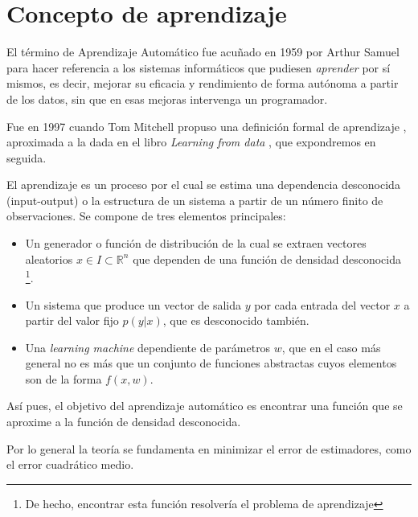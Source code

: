 %

\section{Concepto de aprendizaje}\label{sec:Aprendizaje}

El término de Aprendizaje Automático 
\cite{hisour} 
fue acuñado en 1959 por Arthur Samuel 
para hacer referencia a los sistemas informáticos que 
pudiesen \textit{aprender} por sí mismos, es decir, mejorar su 
eficacia y rendimiento de forma autónoma a partir de los datos, 
sin que en esas mejoras intervenga un programador.

Fue en 1997 cuando Tom Mitchell propuso una definición 
formal de aprendizaje 
\cite{tom-michell-machine-learning}, 
aproximada a la dada en el libro \textit{Learning from data}
\cite{learning-from-data-1-2}, que expondremos en seguida.

El aprendizaje es un proceso por el cual se estima una dependencia desconocida 
(input-output) o la estructura de un sistema a partir de un número finito de 
observaciones. Se compone de tres elementos principales: 

\begin{itemize}
    \item Un generador o función de distribución de la cual se extraen 
    vectores aleatorios 
    $x \in I \subset \mathbb R^ n$ 
    que dependen de una función de densidad desconocida \footnote{De hecho, encontrar esta función resolvería el problema de aprendizaje}.
    
    \item Un sistema que produce un vector de salida $y$ por cada entrada del vector $x$ a partir del valor fijo $p(y|x)$, que es desconocido también. 
    
    \item Una \textit{learning machine} dependiente de parámetros $w$, que en el caso más general no es  más que un conjunto de funciones abstractas cuyos elementos son de la forma $f(x,w)$.
\end{itemize}



Así pues, el objetivo del aprendizaje automático es encontrar una función que se aproxime a la función de densidad desconocida.

Por lo general la teoría se fundamenta en minimizar el error de estimadores, como el error cuadrático medio.

